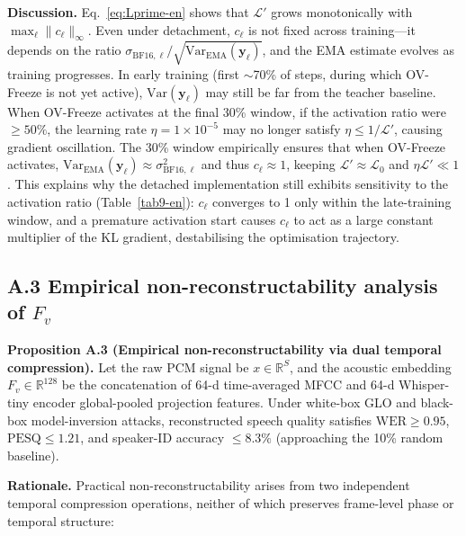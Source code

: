 \documentclass[11pt, a4paper]{article}
\begin{document}
\noindent\textbf{Discussion.} Eq.~\eqref{eq:Lprime-en} shows that $\mathcal{L}'$ grows monotonically with $\max_\ell\|c_\ell\|_\infty$. Even under detachment, $c_\ell$ is not fixed across training---it depends on the ratio $\sigma_{\mathrm{BF16},\ell} / \sqrt{\mathrm{Var}_{\mathrm{EMA}}(\bm{y}_\ell)}$, and the EMA estimate evolves as training progresses. In early training (first $\sim$70\% of steps, during which OV-Freeze is not yet active), $\mathrm{Var}(\bm{y}_\ell)$ may still be far from the teacher baseline. When OV-Freeze activates at the final 30\% window, if the activation ratio were $\ge 50\%$, the learning rate $\eta = 1\times 10^{-5}$ may no longer satisfy $\eta \le 1/\mathcal{L}'$, causing gradient oscillation. The 30\% window empirically ensures that when OV-Freeze activates, $\mathrm{Var}_{\mathrm{EMA}}(\bm{y}_\ell) \approx \sigma^2_{\mathrm{BF16},\ell}$ and thus $c_\ell \approx 1$, keeping $\mathcal{L}' \approx \mathcal{L}_0$ and $\eta \mathcal{L}' \ll 1$. This explains why the detached implementation still exhibits sensitivity to the activation ratio (Table~\ref{tab9-en}): $c_\ell$ converges to 1 only within the late-training window, and a premature activation start causes $c_\ell$ to act as a large constant multiplier of the KL gradient, destabilising the optimisation trajectory.

\subsection*{A.3 Empirical non-reconstructability analysis of $F_v$}

\noindent\textbf{Proposition A.3 (Empirical non-reconstructability via dual temporal compression).} Let the raw PCM signal be $x\in\mathbb{R}^{S}$, and the acoustic embedding $F_v\in\mathbb{R}^{128}$ be the concatenation of 64-d time-averaged MFCC and 64-d Whisper-tiny encoder global-pooled projection features. Under white-box GLO and black-box model-inversion attacks, reconstructed speech quality satisfies $\text{WER}\ge 0.95$, $\text{PESQ}\le 1.21$, and speaker-ID accuracy $\le 8.3\%$ (approaching the 10\% random baseline).

\noindent\textbf{Rationale.} Practical non-reconstructability arises from two independent temporal compression operations, neither of which preserves frame-level phase or temporal structure:
\end{document}
